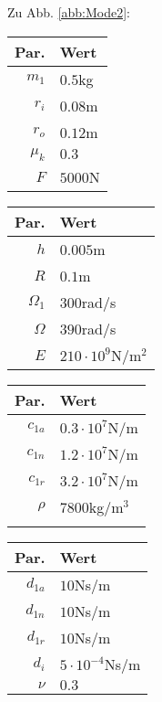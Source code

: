 Zu Abb. \ref{abb:Mode2}: 
\begin{center}
	\begin{tabular}{r|l}
		Par.&Wert\\\hline
		$m_1$&$0.5$kg\\
		$r_i$&$0.08$m\\
		$r_o$&$0.12$m\\
		$\mu_k$& $0.3$\\
		$F$&$5000$N\\
	\end{tabular}\hfill
	\begin{tabular}{r|l}
		Par.&Wert\\\hline
		$h$&$0.005$m\\
		$R$&$0.1$m\\
		$\Omega_1$&$300$rad/s\\
		$\Omega$& $390$rad/s \\
		$E$&$210\cdot10^9$N/m$^2$\\
	\end{tabular}\hfill
	\begin{tabular}{r|l}
		Par.&Wert\\\hline
		$c_{1a}$&$0.3\cdot10^{7}$N/m\\
		$c_{1n}$&$1.2\cdot10^{7}$N/m\\
		$c_{1r}$&$3.2\cdot10^{7}$N/m\\
		$\rho$&$7800$kg/m$^3$\\
		&
	\end{tabular}\hfill
	\begin{tabular}{r|l}
		Par.&Wert\\\hline
		$d_{1a}$&$10$Ns/m\\
		$d_{1n}$&$10$Ns/m\\
		$d_{1r}$&$10$Ns/m\\
		$d_i$ &$5\cdot10^{-4}$Ns/m\\
		$\nu$&$0.3$\\
	\end{tabular}
\end{center}

